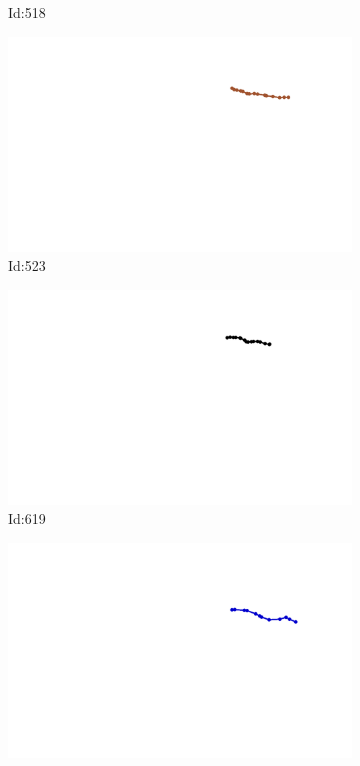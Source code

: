 \documentclass[12pt,twoside]{report}
\begin{document}
\begin{figure}
\begin{subfigure}[b]{0.20\textwidth}
\caption{Id:518}
\end{subfigure}
\begin{subfigure}[b]{0.20\textwidth}
\centering
\includegraphics[width=\textwidth]{../trajectories/523.png}
\caption{Id:523}
\end{subfigure}
\begin{subfigure}[b]{0.20\textwidth}
\centering
\includegraphics[width=\textwidth]{../trajectories/619.png}
\caption{Id:619}
\end{subfigure}
\begin{subfigure}[b]{0.20\textwidth}
\centering
\includegraphics[width=\textwidth]{../trajectories/637.png}

\end{subfigure}
\end{figure}
\end{document}
